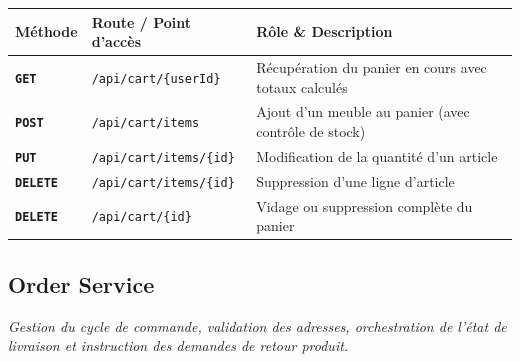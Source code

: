 \documentclass[10pt,a4paper]{article}
\begin{document}
\begin{center}
\renewcommand{\arraystretch}{1.08}
\begin{tabularx}{\textwidth}{@{} l p{6.8cm} >{\raggedright\arraybackslash}X @{}}
\toprule[0.8pt]
\rowcolor{hdrcolor}
\textbf{Méthode} & \textbf{Route / Point d'accès} & \textbf{Rôle \& Description} \\
\midrule
\textcolor{syncblue}{\texttt{\textbf{GET}}}    & \texttt{/api/cart/\{userId\}} & Récupération du panier en cours avec totaux calculés \\
\textcolor{postgreen}{\texttt{\textbf{POST}}}   & \texttt{/api/cart/items} & Ajout d'un meuble au panier (avec contrôle de stock) \\
\textcolor{secondary}{\texttt{\textbf{PUT}}}    & \texttt{/api/cart/items/\{id\}} & Modification de la quantité d'un article \\
\textcolor{pkcolor}{\texttt{\textbf{DELETE}}} & \texttt{/api/cart/items/\{id\}} & Suppression d'une ligne d'article \\
\textcolor{pkcolor}{\texttt{\textbf{DELETE}}} & \texttt{/api/cart/\{id\}} & Vidage ou suppression complète du panier \\
\bottomrule[0.8pt]
\end{tabularx}
\end{center}

\vspace{3pt}

\subsection{Order Service}
\textit{Gestion du cycle de commande, validation des adresses, orchestration de l'état de livraison et instruction des demandes de retour produit.}
\end{document}
